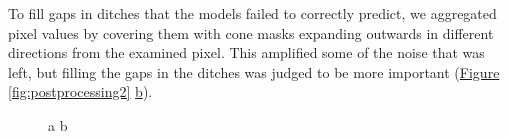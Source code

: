 \documentclass[11pt, review]{elsarticle} %
\begin{document}
To fill gaps in ditches that the models failed to correctly predict, we aggregated pixel values by covering them with cone masks expanding outwards in different directions from the examined pixel. This amplified some of the noise that was left, but filling the gaps in the ditches was judged to be more important (\hyperref[fig:postprocessing2]{Figure} \ref{fig:postprocessing2} \hyperref[fig:postprocessing2]{b}).

\begin{figure} [!htb]
    \centering
    a{
        }\hspace{5pt}
    b{
}
\end{figure}
\end{document}
